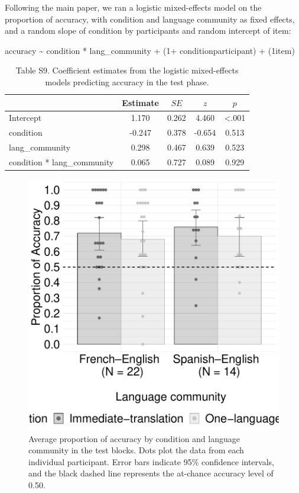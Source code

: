 \documentclass[
  man,floatsintext]{apa7}
\begin{document}
Following the main paper, we ran a logistic mixed-effects model on the proportion of accuracy, with condition and language community as fixed effects, and a random slope of condition by participants and random intercept of item:

accuracy \textasciitilde{} condition * lang\_community + (1+ condition\textbar participant) + (1\textbar item)

\begin{table}[H]

\begin{center}
\begin{threeparttable}

\caption{\label{tab:unnamed-chunk-28}Table S9. Coefficient estimates from the logistic mixed-effects models predicting accuracy in the test phase.}

\begin{tabular}{lcccc}
\toprule
 & Estimate & $SE$ & $z$ & $p$\\
\midrule
Intercept & 1.170 & 0.262 & 4.460 & <.001\\
condition & -0.247 & 0.378 & -0.654 & 0.513\\
lang\_community & 0.298 & 0.467 & 0.639 & 0.523\\
condition * lang\_community & 0.065 & 0.727 & 0.089 & 0.929\\
\bottomrule
\end{tabular}

\end{threeparttable}
\end{center}

\end{table}

\begin{figure}

{\centering \includegraphics[width=0.6\linewidth]{TabletSwitch_supplemental_files/figure-latex/FigureS5-1} 

}

\caption{Average proportion of accuracy by condition and language community in the test blocks. Dots plot the data from each individual participant. Error bars indicate 95\% confidence intervals, and the black dashed line represents the at-chance accuracy level of 0.50.}\label{fig:FigureS5}
\end{figure}
\end{document}
